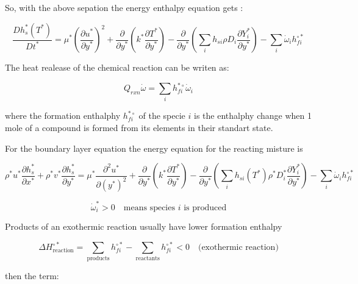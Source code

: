 So, with the above sepation the  energy enthalpy equation gets :

\begin{equation}
\frac{D h_{s}^*(T^*)}{D t^*}
=
\mu^*
\left(
\frac{\partial u^*}{\partial y^*}
\right)^2
+
\frac{\partial}{\partial y^*}
\left(
    k^*\frac{\partial T^*}{\partial y^*}
\right)
-
\frac{\partial}{\partial y^*}
\left(
        \sum_i
        h_{si}
        \rho 
        D_i
        \frac{\partial Y_i^*}{\partial y^*}
\right)
-
\sum_i  
\dot{\omega}_i
h_{fi}^{\circ*}
\end{equation} 

The heat realease of the chemical reaction  
can be writen as: 

\begin{equation} 
    Q_{rxn}
    \dot{\omega}
    =
    \sum_i h_{fi}^{*\circ}
    \dot{\omega}_i
\end{equation} 

where the formation enthalphy  $h_{fi}^{*\circ}$ 
of the specie $i$ is
the enthalphy change when 1 mole of a compound 
is formed from its elements in their standart state. 

For the boundary layer equation the energy equation 
for the reacting misture is  

\begin{equation}
\rho^* u^* \frac{\partial h_s^*}{\partial x^*}+
\rho^* v^* \frac{\partial h_s^*}{\partial y^*}
=
\mu^*\frac{\partial^2 u^*}{\partial (y^*)^2}+
\frac{\partial}{\partial y^*}
\left(
    k^*\frac{\partial T^*}{\partial y^*}
\right)
-
\frac{\partial}{\partial y^*}
\left(
        \sum_i
        h_{si}(T^*)
        \rho^* 
        D_i^*
        \frac{\partial Y_i^*}{\partial y^*}
\right)
-
\sum_i  
\dot{\omega}_i
h_{fi}^{\circ*}
\end{equation} 

\begin{equation} 
\dot{\omega}_i^* > 0 \quad \text{means species } i \text{ is produced}
\end{equation} 

Products of an exothermic reaction usually have lower formation enthalpy

\begin{equation} 
\Delta H^{\circ*}_{\text{reaction}}
=
\sum_{\text{products}} h_{fi}^{\circ*}
-
\sum_{\text{reactants}} h_{fi}^{\circ*}
< 0
\quad \text{(exothermic reaction)}
\end{equation} 

then the term: 

